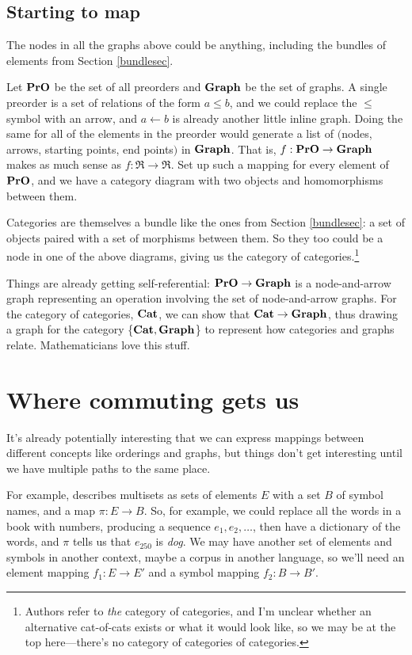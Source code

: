 \documentclass[11pt]{article}
\begin{document}
\subsection{Starting to map}
The nodes in all the graphs above could be anything, including the bundles of elements from
Section \ref{bundlesec}.

Let ${\bf PrO}$ be the set of all preorders and ${\bf Graph}$ be the set of graphs. A
single preorder is a set of relations of the form $a \leq b$, and we could replace the $\leq$
symbol with an arrow, and $a\leftarrow b$ is already another little inline graph. 
Doing the same for all of the elements in the preorder would generate a list of
$($nodes, arrows, starting points, end points$)$ in ${\bf Graph}$.
That is, $f:{\bf PrO}\to {\bf Graph}$ makes as much sense as $f:\Re \to \Re$. Set up such
a mapping for every element of ${\bf PrO}$, and we have a category diagram with two
objects and homomorphisms between them.

Categories are themselves a bundle like the ones from Section \ref{bundlesec}: a set
of objects paired with a set of morphisms between them. So they too could be a node in
one of the above diagrams, giving us the category of categories.\footnote{Authors refer
to {\em the} category of categories, and I'm unclear whether an alternative cat-of-cats
exists or what it would look like, so we may be at the top here---there's no category of
categories of categories.}

Things are already getting self-referential: ${\bf PrO}\to {\bf Graph}$ is a node-and-arrow
graph representing an operation involving the set of node-and-arrow graphs. For the 
category of categories, ${\bf Cat}$, we can show that ${\bf Cat}\to {\bf Graph}$, thus
drawing a graph for the category \{${\bf Cat}, {\bf Graph}$\} to represent how categories and graphs relate.
Mathematicians love this stuff.

\section{Where commuting gets us} It's already potentially interesting that we can
express mappings between different concepts like orderings and graphs, but things don't get
interesting until we have multiple paths to the same place.


For example,
\citet{spivak:category} describes multisets as sets of elements $E$ with a set $B$ of
symbol names, and a map $\pi:E\to B$. So, for example, we could replace all the words in a
book with numbers, producing a sequence $e_1, e_2, \dots$, then have a dictionary
of the words, and $\pi$ tells us that $e_{250}$ is {\em dog}. We
may have another set of elements and symbols in another context, maybe a corpus in
another language, so we'll need an element mapping $f_1:E\to E'$ and a symbol mapping
$f_2:B\to B'$.
\end{document}
